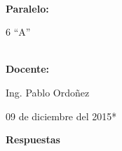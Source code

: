 \documentclass[9pt]{article}
\begin{document}
	\textbf{\\
		{\Large Paralelo:}\\
	}
	
	{\Large 6 ``A''}
	
	\textbf{\\
		{\Large Docente:}\\
	}
	
	{\Large Ing. Pablo Ordo\~nez}\\
	
	
	\begin{center}
		
		{\Large * 09 de diciembre del 2015*}
	\end{center}
	
\newpage

\begin{center}
\textbf{{\huge Respuestas}}

\end{center}
\end{document}
